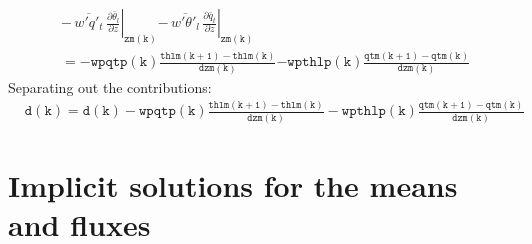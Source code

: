 \documentclass[11pt,fleqn]{article}
\newcommand{\ptlder}[2]{\frac{\partial #1}{\partial #2}}
\begin{document}
\begin{equation}
\begin{split}
&\left. -\,\overline{w'q'_t} \, \ptlder{\bar{\theta}_l}{z} \right|_{\mathtt{zm(k)}}
 \left. -\,\overline{w'\theta'_l} \, \ptlder{\bar{q}_t}{z} \right|_{\mathtt{zm(k)}} \\
&= \mathtt{ - wpqtp(k) \frac{thlm(k+1)-thlm(k)}{dzm(k)} }
   \mathtt{ - wpthlp(k) \frac{qtm(k+1)-qtm(k)}{dzm(k)} }
\end{split}
\end{equation}
%
Separating out the contributions:
%
\begin{equation}
\begin{split}
&\mathtt{d(k) = d(k) - wpqtp(k) \frac{thlm(k+1)-thlm(k)}{dzm(k)}
                     - wpthlp(k) \frac{qtm(k+1)-qtm(k)}{dzm(k)} }
\end{split}
\end{equation}

\section{Implicit solutions for the means and fluxes}
\end{document}
